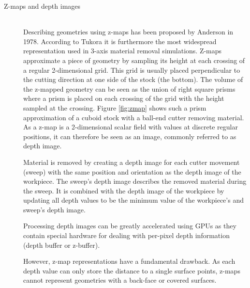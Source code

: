 \begin{description}
	 
	\item[Z-maps and depth images] \hfill \\
	Describing geometries using z-maps has been proposed by Anderson \cite{zmap} in 1978.
	According to Tukora it is furthermore the most widespread representation used in 3-axis material removal simulations.
	Z-maps approximate a piece of geometry by sampling its height at each crossing of a regular 2-dimensional grid.
	This grid is usually placed perpendicular to the cutting direction at one side of the stock (\eg the bottom).
	The volume of the z-mapped geometry can be seen as the union of right square prisms where a prism is placed on each crossing of the grid with the height sampled at the crossing.
	Figure \ref{fig:zmap} shows such a prism approximation of a cuboid stock with a ball-end cutter removing material.
	As a z-map is a 2-dimensional scalar field with values at discrete regular positions, it can therefore be seen as an image, commonly referred to as depth image.
	
	Material is removed by creating a depth image for each cutter movement (\aka sweep) with the same position and orientation as the depth image of the workpiece.
	The sweep's depth image describes the removed material during the sweep.
	It is combined with the depth image of the workpiece by updating all depth values to be the minimum value of the workpiece's and sweep's depth image.

	Processing depth images can be greatly accelerated using GPUs as they contain special hardware for dealing with per-pixel depth information (\ie depth buffer or z-buffer).
	
	However, z-map representations have a fundamental drawback.
	As each depth value can only store the distance to a single surface points, z-maps cannot represent geometries with a back-face or covered surfaces.
	

\end{description}
